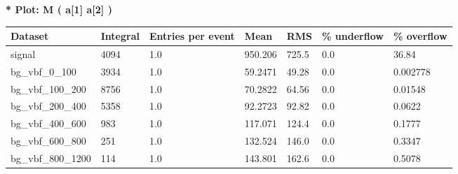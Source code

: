 \documentclass[a4paper, 10pt]{article}
\begin{document}
\textbf{* Plot: M ( a[1] a[2] ) }\\
   \begin{table}[H]
  \begin{center}
    \begin{tabular}{|m{23.0mm}|m{23.0mm}|m{18.0mm}|m{19.0mm}|m{19.0mm}|m{19.0mm}|m{19.0mm}|}
      \hline
      {\cellcolor{yellow}         Dataset}& {\cellcolor{yellow}         Integral}& {\cellcolor{yellow}         Entries per event}& {\cellcolor{yellow}         Mean}& {\cellcolor{yellow}         RMS}& {\cellcolor{yellow}         \% underflow}& {\cellcolor{yellow}         \% overflow}\\
      \hline
      {\cellcolor{white}         signal}& {\cellcolor{white}         4094}& {\cellcolor{white}         1.0}& {\cellcolor{white}         950.206}& {\cellcolor{white}         725.5}& {\cellcolor{red}         0.0}& {\cellcolor{red}         36.84}\\
      \hline
      {\cellcolor{white}         bg\_vbf\_0\_100}& {\cellcolor{white}         3934}& {\cellcolor{white}         1.0}& {\cellcolor{white}         59.2471}& {\cellcolor{white}         49.28}& {\cellcolor{green}         0.0}& {\cellcolor{green}         0.002778}\\
      \hline
      {\cellcolor{white}         bg\_vbf\_100\_200}& {\cellcolor{white}         8756}& {\cellcolor{white}         1.0}& {\cellcolor{white}         70.2822}& {\cellcolor{white}         64.56}& {\cellcolor{green}         0.0}& {\cellcolor{green}         0.01548}\\
      \hline
      {\cellcolor{white}         bg\_vbf\_200\_400}& {\cellcolor{white}         5358}& {\cellcolor{white}         1.0}& {\cellcolor{white}         92.2723}& {\cellcolor{white}         92.82}& {\cellcolor{green}         0.0}& {\cellcolor{green}         0.0622}\\
      \hline
      {\cellcolor{white}         bg\_vbf\_400\_600}& {\cellcolor{white}         983}& {\cellcolor{white}         1.0}& {\cellcolor{white}         117.071}& {\cellcolor{white}         124.4}& {\cellcolor{green}         0.0}& {\cellcolor{green}         0.1777}\\
      \hline
      {\cellcolor{white}         bg\_vbf\_600\_800}& {\cellcolor{white}         251}& {\cellcolor{white}         1.0}& {\cellcolor{white}         132.524}& {\cellcolor{white}         146.0}& {\cellcolor{green}         0.0}& {\cellcolor{green}         0.3347}\\
      \hline
      {\cellcolor{white}         bg\_vbf\_800\_1200}& {\cellcolor{white}         114}& {\cellcolor{white}         1.0}& {\cellcolor{white}         143.801}& {\cellcolor{white}         162.6}& {\cellcolor{green}         0.0}& {\cellcolor{green}         0.5078}\\

\end{tabular}
\end{center}
\end{table}
\end{document}
